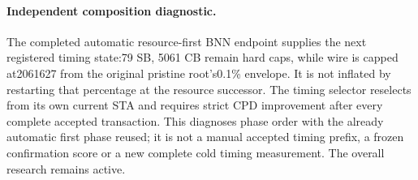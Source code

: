 \paragraph{Independent composition diagnostic.}
The completed automatic resource-first BNN endpoint supplies the next registered timing state:79 SB, 5061 CB remain hard caps, while wire is capped at2061627 from the original pristine root's0.1\% envelope. It is not inflated by restarting that percentage at the resource successor. The timing selector reselects from its own current STA and requires strict CPD improvement after every complete accepted transaction. This diagnoses phase order with the already automatic first phase reused; it is not a manual accepted timing prefix, a frozen confirmation score or a new complete cold timing measurement. The overall research remains active.
